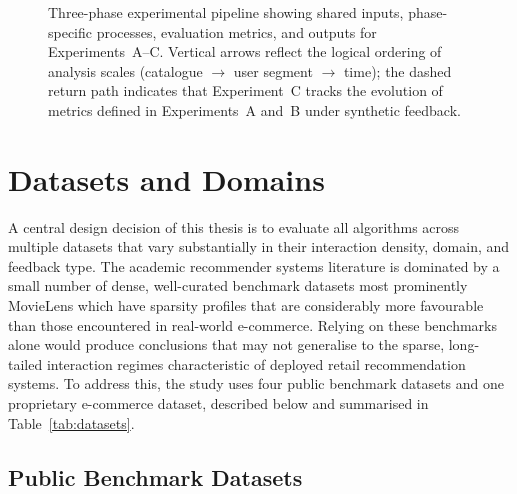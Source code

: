 \documentclass[11pt,a4paper]{report}
\begin{document}
\begin{figure}[htbp]
  \caption{Three-phase experimental pipeline showing shared inputs, phase-specific processes, evaluation metrics, and outputs for Experiments~A--C. Vertical arrows reflect the logical ordering of analysis scales (catalogue $\rightarrow$ user segment $\rightarrow$ time); the dashed return path indicates that Experiment~C tracks the evolution of metrics defined in Experiments~A and~B under synthetic feedback.}
  \label{fig:pipeline}
\end{figure}

\section{Datasets and Domains}
\label{sec:method_datasets}

A central design decision of this thesis is to evaluate all algorithms across multiple datasets that vary substantially in their interaction density, domain, and feedback type. The academic recommender systems literature is dominated by a small number of dense, well-curated benchmark datasets most prominently MovieLens which have sparsity profiles that are considerably more favourable than those encountered in real-world e-commerce. Relying on these benchmarks alone would produce conclusions that may not generalise to the sparse, long-tailed interaction regimes characteristic of deployed retail recommendation systems. To address this, the study uses four public benchmark datasets and one proprietary e-commerce dataset, described below and summarised in Table~\ref{tab:datasets}.

\subsection*{Public Benchmark Datasets}
\end{document}
